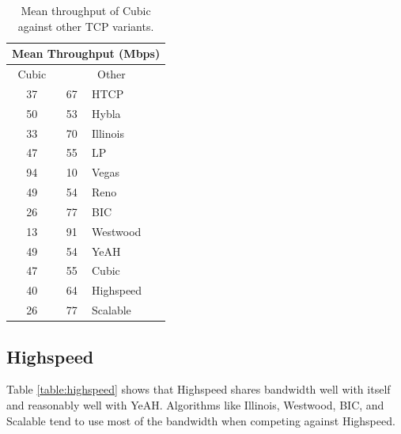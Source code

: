 \documentclass[11pt,a4paper,twocolumn]{article}
\begin{document}
\begin{table}[h!]
	\begin{center}
		\begin{tabular}{| c | c | l |}
    			\hline
			\multicolumn{3}{|c|}{Mean Throughput (Mbps)} \\
    			\hline
    			Cubic &  \multicolumn{2}{|c|}{Other}  \\
			\hline
    			37 & 67 & HTCP \\
			\hline
    			50 & 53 & Hybla \\
			\hline
    			33 & 70 & Illinois \\
			\hline
    			47 & 55 & LP \\
			\hline
    			94 & 10 & Vegas \\
			\hline
    			49 & 54 & Reno \\
			\hline
    			26 & 77 & BIC \\
			\hline
    			13 & 91 & Westwood \\
			\hline
    			49 & 54 & YeAH \\
			\hline
    			47 & 55 & Cubic \\
			\hline
    			40 & 64 & Highspeed \\
			\hline
    			26 & 77 & Scalable \\
    			\hline
    		\end{tabular}
  	\end{center}
  	\caption{Mean throughput of Cubic against other TCP variants.}
	\label{table:cubic}
\end{table}

\subsection{Highspeed}
\label{subsec:highspeed}
Table \ref{table:highspeed} shows that Highspeed shares bandwidth well with itself and reasonably well with
YeAH. Algorithms like Illinois, Westwood, BIC, and Scalable tend to use most of the bandwidth when
competing against Highspeed.
\end{document}
